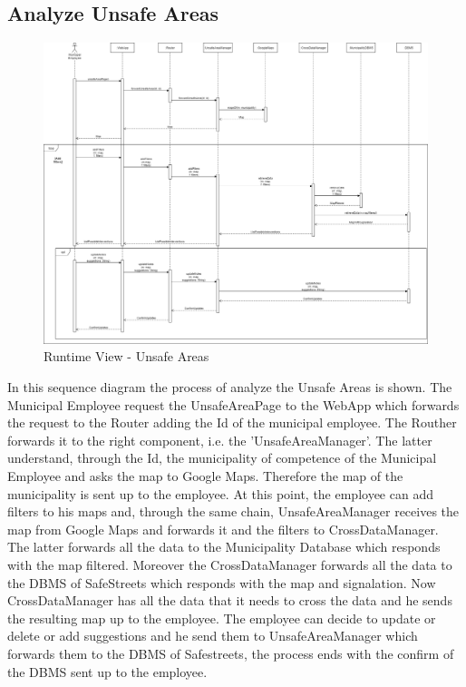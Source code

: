        \subsection{Analyze Unsafe Areas}
        \begin{figure}[H]
            \includegraphics[scale=0.28]{dd/resources/images/RuntimeView-UnsafeAreas}
            \caption{Runtime View - Unsafe Areas}        
        \end{figure}
        In this sequence diagram the process of analyze the Unsafe Areas is shown. The Municipal 
        Employee request the UnsafeAreaPage to the WebApp which forwards the request to the Router 
        adding the Id of the municipal employee. The Routher forwards it to the right component, 
        i.e. the 'UnsafeAreaManager'. The latter understand, through the Id, the municipality of 
        competence of the Municipal Employee and asks the map to Google Maps. Therefore the map 
        of the municipality is sent up to the employee. At this point, the employee can add filters 
        to his maps and, through the same chain, UnsafeAreaManager receives the map from Google 
        Maps and forwards it and the filters to CrossDataManager. The latter forwards all the data 
        to the Municipality Database which responds with the map filtered. Moreover the CrossDataManager 
        forwards all the data to the DBMS of SafeStreets which responds with the map and signalation. 
        Now CrossDataManager has all the data that it needs to cross the data and he sends the resulting 
        map up to the employee. The employee can decide to update or delete or add suggestions and he 
        send them to UnsafeAreaManager which forwards them to the DBMS of Safestreets, the process ends 
        with the confirm of the DBMS sent up to the employee.

